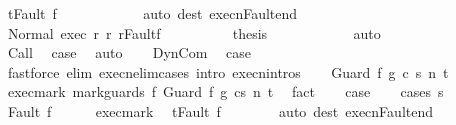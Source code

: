 \begin{isabellebody}
\ {\isachardoublequoteopen}t{\isacharequal}Fault\ f{\isachardoublequoteclose}\isanewline
\ \ \ \ \ \ \ \ \ \ \isamarkupfalse%
\ {\isacharparenleft}auto\ dest{\isacharcolon}\ execn{\isacharunderscore}Fault{\isacharunderscore}end{\isacharparenright}\isanewline
\ \ \ \ \ \ \ \ \isamarkupfalse%
\ Normal\ exec\ r{\isacharprime}\ r\ r{\isacharprime}{\isacharunderscore}Fault{\isacharunderscore}f\isanewline
\ \ \ \ \ \ \ \ \isamarkupfalse%
\ {\isacharquery}thesis\isanewline
\ \ \ \ \ \ \ \ \ \ \isamarkupfalse%
\ auto\isanewline
\ \ \ \ \ \ \isamarkupfalse%
\isanewline
\ \ \ \ \isamarkupfalse%
\isanewline
\ \ \isamarkupfalse%
\isanewline
{}\isamarkupfalse%
\isanewline
\ \ \isamarkupfalse%
\ Call\ \isamarkupfalse%
\ {\isacharquery}case\ \isamarkupfalse%
\ auto\isanewline
{}\isamarkupfalse%
\isanewline
\ \ \isamarkupfalse%
\ DynCom\ \isamarkupfalse%
\ {\isacharquery}case\ \isanewline
\ \ \ \ \isamarkupfalse%
\ {\isacharparenleft}fastforce\ elim{\isacharbang}{\isacharcolon}\ execn{\isacharunderscore}elim{\isacharunderscore}cases\ intro{\isacharcolon}\ execn{\isachardot}intros{\isacharparenright}\isanewline
{}\isamarkupfalse%
\isanewline
\ \ \isamarkupfalse%
\ {\isacharparenleft}Guard\ f{\isacharprime}\ g\ c\ s\ n\ t{\isacharparenright}\isanewline
\ \ \isamarkupfalse%
\ exec{\isacharunderscore}mark{\isacharcolon}\ {\isachardoublequoteopen}{\isasymGamma}{\isasymturnstile}{\isasymlangle}mark{\isacharunderscore}guards\ f\ {\isacharparenleft}Guard\ f{\isacharprime}\ g\ c{\isacharparenright}{\isacharcomma}s{\isasymrangle}\ {\isacharequal}n{\isasymRightarrow}\ t{\isachardoublequoteclose}\ \isamarkupfalse%
\ fact\isanewline
\ \ \isamarkupfalse%
\ {\isacharquery}case\isanewline
\ \ \isamarkupfalse%
\ {\isacharparenleft}cases\ s{\isacharparenright}\isanewline
\ \ \ \ \isamarkupfalse%
\ {\isacharparenleft}Fault\ f{\isacharparenright}\isanewline
\ \ \ \ \isamarkupfalse%
\ exec{\isacharunderscore}mark\ \isamarkupfalse%
\ {\isachardoublequoteopen}t{\isacharequal}Fault\ f{\isachardoublequoteclose}\isanewline
\ \ \ \ \ \ \isamarkupfalse%
\ {\isacharparenleft}auto\ dest{\isacharcolon}\ execn{\isacharunderscore}Fault{\isacharunderscore}end{\isacharparenright}\isanewline
\ \ \ \ \isamarkupfalse%

\end{isabellebody}
